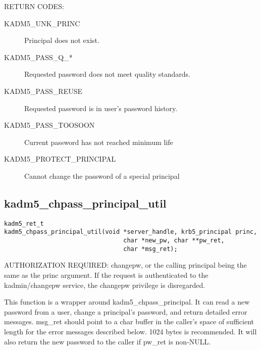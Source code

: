RETURN CODES:

\begin{description}
\item[KADM5_UNK_PRINC] Principal does not exist.
\item[KADM5_PASS_Q_*] Requested password does not meet quality
standards. 
\item[KADM5_PASS_REUSE] Requested password is in user's
password history. 
\item[KADM5_PASS_TOOSOON] Current password has not reached minimum life
\item[KADM5_PROTECT_PRINCIPAL] Cannot change the password of a special principal
\end{description}


\subsection{kadm5_chpass_principal_util}

\begin{verbatim}
kadm5_ret_t
kadm5_chpass_principal_util(void *server_handle, krb5_principal princ,
                                 char *new_pw, char **pw_ret,
                                 char *msg_ret);
\end{verbatim}

AUTHORIZATION REQUIRED: changepw, or the calling principal being the
same as the princ argument.  If the request is authenticated to the
kadmin/changepw service, the changepw privilege is disregarded.

This function is a wrapper around kadm5_chpass_principal. It can
read a new password from a user, change a principal's password, and
return detailed error messages.  msg_ret should point to a char buffer
in the caller's space of sufficient length for the error messages
described below. 1024 bytes is recommended.  It will also return the
new password to the caller if pw_ret is non-NULL.

